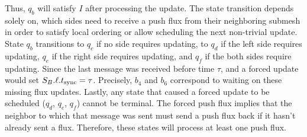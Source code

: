  Thus, $q_b$ will satisfy $I$ after processing the update. The state transition depends solely on, which sides need to receive a push flux from their neighboring submesh in order to satisfy local ordering or allow scheduling the next non-trivial update. State $q_b$ transitions to $q_c$ if no side requires updating, to $q_d$ if the left side requires updating, $q_e$ if the right side requires updating, and $q_f$ if the both sides require updating. Since the last message was received before time $\tau$, and a forced update would set $S_B.\ell.t_{\text{sync}} = \tau$. Precisely, $b_4$ and $b_6$ correspond to waiting on these missing flux updates. Lastly, any state that caused a forced update to be scheduled ($q_d$, $q_e$, $q_f$) cannot be terminal. The forced push flux implies that the neighbor to which that message was sent must send a push flux back if it hasn't already sent a flux. Therefore, these states will process at least one push flux.

